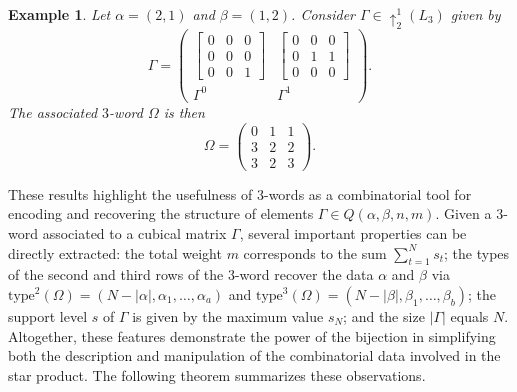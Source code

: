 \documentclass[11pt]{article}
\newtheorem{exa}[thm]{Example}
\begin{document}
\begin{exa}\label{3Palabra}
Let $\alpha = (2,1)$ and $\beta = (1,2)$. Consider $\Gamma \in \uparrow_{2}^{1}(L_3)$ given by
\[
\Gamma =
\left(
\begin{array}{cc}
\begin{bmatrix}
0 & 0 & 0 \\
0 & 0 & 0 \\
0 & 0 & 1
\end{bmatrix} &
\begin{bmatrix}
0 & 0 & 0 \\
0 & 1 & 1 \\
0 & 0 & 0
\end{bmatrix} \\
\Gamma^0 & \Gamma^1
\end{array}
\right).
\]
The associated $3$-word $\Omega$ is then
\[
\Omega =
\begin{pmatrix}
0 & 1 & 1 \\
3 & 2 & 2 \\
3 & 2 & 3
\end{pmatrix}.
\]
\end{exa}



These results highlight the usefulness of 3-words as a combinatorial tool for encoding and recovering the structure of elements \( \Gamma \in Q(\alpha, \beta, n, m) \). Given a 3-word associated to a cubical matrix \( \Gamma \), several important properties can be directly extracted: the total weight \( m \) corresponds to the sum \( \sum_{t=1}^{N} s_t \); the types of the second and third rows of the 3-word recover the data \( \alpha \) and \( \beta \) via \( \text{type}^2(\Omega) = (N - |\alpha|, \alpha_1, \dots, \alpha_a) \) and \( \text{type}^3(\Omega) = (N - |\beta|, \beta_1, \dots, \beta_b) \); the support level \( s \) of \( \Gamma \) is given by the maximum value \( s_N \); and the size \( |\Gamma| \) equals \( N \). Altogether, these features demonstrate the power of the bijection in simplifying both the description and manipulation of the combinatorial data involved in the star product. The following theorem summarizes these observations.
\end{document}
